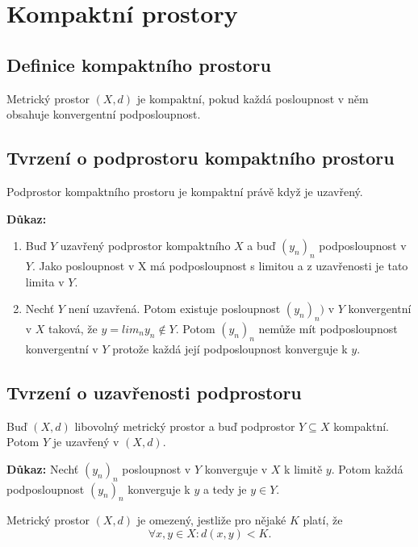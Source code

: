\documentclass[../main.tex]{subfiles}
\begin{document}
\section{Kompaktní prostory}
\subsection{Definice kompaktního prostoru}
\hspace{1.2mm}
\noindent
Metrický prostor $(X,d)$ je kompaktní, pokud každá posloupnost v něm obsahuje konvergentní podposloupnost.

\subsection{Tvrzení o podprostoru kompaktního prostoru}
\hspace{1.2mm}
\noindent
Podprostor kompaktního prostoru je kompaktní právě když je uzavřený.

\vspace{5mm}
\noindent
\textbf{Důkaz:} 
\begin{enumerate}
    \item Buď $Y$ uzavřený podprostor kompaktního $X$ a buď $(y_n)_n$ podposloupnost v $Y$. Jako posloupnost v X má podposloupnost s limitou
    a z uzavřenosti je tato limita v $Y$.
    \item Nechť $Y$ není uzavřená. Potom existuje posloupnost $(y_n)_n)$ v $Y$ konvergentní v $X$ taková, že $y = lim_n y_n \notin Y$. Potom $(y_n)_n$
    nemůže mít podposloupnost konvergentní v $Y$ protože každá její podposloupnost konverguje k $y$.
\end{enumerate}

\subsection{Tvrzení o uzavřenosti podprostoru}
\hspace{1.2mm}
\noindent
Buď $(X,d)$ libovolný metrický prostor a
buď podprostor $Y \subseteq X$ kompaktní. Potom $Y$ je uzavřený v $(X,d)$.

\vspace{5mm}
\noindent
\textbf{Důkaz:} Nechť $(y_n)_n$ posloupnost v $Y$ konverguje v $X$ k limitě $y$. Potom každá podposloupnost $(y_n)_n$ konverguje k 
$y$ a tedy je $y \in Y$.
\begin{center}
    Metrický prostor $(X,d)$ je omezený, jestliže pro nějaké $K$ platí, že 
    \[\forall x,y \in X : d(x,y) < K.\]
\end{center}
\end{document}
